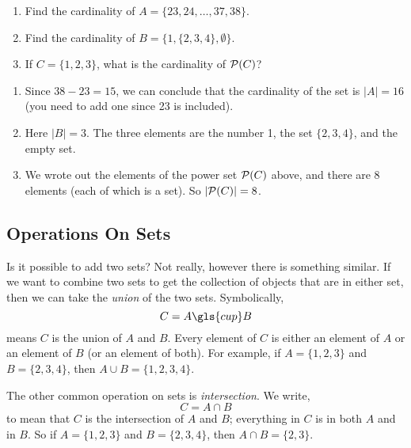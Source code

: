 \documentclass[12pt]{article}
\begin{document}
\begin{example}
\begin{enumerate}
\item Find the cardinality of $A = \{23, 24, \ldots, 37, 38\}$.
\item Find the cardinality of $B = \{1, \{2, 3, 4\}, \emptyset\}$.
\item If $C = \{1,2,3\}$, what is the cardinality of $\mathcal P(C)$?
\end{enumerate}

\begin{solution}
\begin{enumerate}
\item Since $38 - 23 = 15$, we can conclude that the cardinality of the set is $|A| = 16$ (you need to add one since 23 is included).
\item Here $|B| = 3$.  The three elements are the number 1, the set $\{2,3,4\}$, and the empty set.
\item We wrote out the elements of the power set $\mathcal P(C)$ above, and there are 8 elements (each of which is a set).  So $|\mathcal P(C)| = 8$.\footnotemark
\end{enumerate}

\end{solution}
\end{example}

\subsection{Operations On Sets}

Is it possible to add two sets?  Not really, however there is something similar.  If we want to combine two sets to get the collection of objects that are in either set, then we can take the \emph{union} of the two sets.  Symbolically,
\[ C = A \gls{cup} B\]
means $C$ is the union of $A$ and $B$.  Every element of $C$ is either an element of $A$ or an element of $B$ (or an element of both).  For example, if $A = \{1, 2, 3\}$ and $B = \{2, 3, 4\}$, then $A \cup B = \{1, 2, 3, 4\}$.

The other common operation on sets is \emph{intersection}.  We write,
\[ C = A \cap B\]
to mean that $C$ is the intersection of $A$ and $B$; everything in $C$ is in both $A$ and in $B$.  So if $A = \{1, 2, 3\}$ and $B = \{2, 3, 4\}$, then $A \cap B = \{2, 3\}$.
\end{document}
